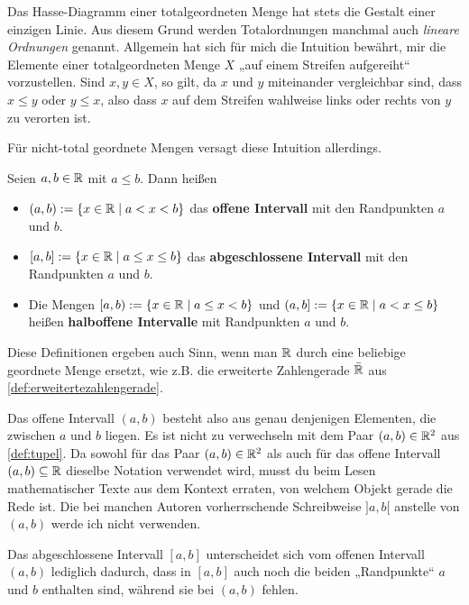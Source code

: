 \begin{bem}
    Das Hasse-Diagramm einer totalgeordneten Menge hat stets die Gestalt einer einzigen Linie. Aus diesem Grund werden Totalordnungen manchmal auch \emph{lineare Ordnungen} genannt. Allgemein hat sich für mich die Intuition bewährt, mir die Elemente einer totalgeordneten Menge $X$ „auf einem Streifen aufgereiht“ vorzustellen. Sind $x,y\in X$, so gilt, da $x$ und $y$ miteinander vergleichbar sind, dass $x\le y$ oder $y\le x$, also dass $x$ auf dem Streifen wahlweise links oder rechts von $y$ zu verorten ist.

    Für nicht-total geordnete Mengen versagt diese Intuition allerdings.
\end{bem}


\begin{defin}[Intervalle in $\R$] \label{def:intervall} 
    Seien $a,b\in \mathbb R$ mit $a\le b$. Dann heißen
    \begin{itemize}
        \item $(a,b) := \{ x\in \mathbb R \mid a<x<b \}$ das \textbf{offene Intervall} mit den Randpunkten $a$ und $b$. 
        \item $[a,b] := \{ x\in \mathbb R \mid a\le x\le b \}$ das \textbf{abgeschlossene Intervall} mit den Randpunkten $a$ und $b$.
        \item Die Mengen $[a,b) := \{ x\in \mathbb R \mid a\le x<b \}$ und $(a,b] := \{ x\in \mathbb R \mid a<x\le b \}$ heißen \textbf{halboffene Intervalle} mit Randpunkten $a$ und $b$. 
    \end{itemize}
    Diese Definitionen ergeben auch Sinn, wenn man $\R$ durch eine beliebige geordnete Menge ersetzt, wie z.B. die erweiterte Zahlengerade $\bar {\mathbb R}$ aus \cref{def:erweitertezahlengerade}.
\end{defin}


\begin{bem}
    Das offene Intervall $(a,b)$ besteht also aus genau denjenigen Elementen, die zwischen $a$ und $b$ liegen. Es ist nicht zu verwechseln mit dem Paar $(a,b)\in \mathbb R^2$ aus \cref{def:tupel}. Da sowohl für das Paar $(a,b)\in \mathbb R^2$ als auch für das offene Intervall $(a,b)\subseteq \mathbb R$ dieselbe Notation verwendet wird, musst du beim Lesen mathematischer Texte aus dem Kontext erraten, von welchem Objekt gerade die Rede ist. Die bei manchen Autoren vorherrschende Schreibweise $]a,b[$ anstelle von $(a,b)$ werde ich nicht verwenden.
    
    Das abgeschlossene Intervall $[a,b]$ unterscheidet sich vom offenen Intervall $(a,b)$ lediglich dadurch, dass in $[a,b]$ auch noch die beiden „Randpunkte“ $a$ und $b$ enthalten sind, während sie bei $(a,b)$ fehlen.
\end{bem}


